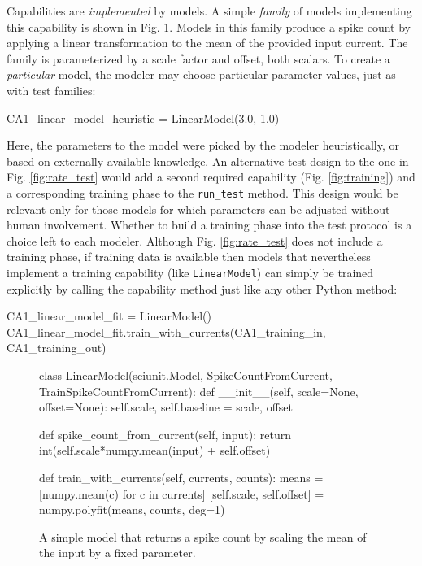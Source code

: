 \documentclass[11pt,letterpaper]{article}
\begin{document}
Capabilities are \emph{implemented} by models. A simple \emph{family} of models implementing this capability is shown in Fig. \ref{fig:simple_model}. Models in this family produce a spike count by applying a linear transformation to the mean of the provided input current. The family is parameterized by a scale factor and offset, both scalars. To create a \emph{particular} model, the modeler may choose particular parameter values, just as with test families:
\begin{python}
CA1_linear_model_heuristic = LinearModel(3.0, 1.0)
\end{python}
Here, the parameters to the model were picked by the modeler heuristically, or based on externally-available knowledge. An alternative test design to the one in Fig. \ref{fig:rate_test} would add a second required capability (Fig. \ref{fig:training}) and a corresponding training phase to the \verb|run_test| method. This design would be relevant only for those models for which parameters can be adjusted without human involvement. Whether to build a training phase into the test protocol is a choice left to each modeler. Although Fig. \ref{fig:rate_test} does not include a training phase, if training data is available then models that nevertheless implement a training capability (like \verb|LinearModel|) can simply be trained explicitly by calling the capability method just like any other Python method:
\begin{python}
CA1_linear_model_fit = LinearModel()
CA1_linear_model_fit.train_with_currents(CA1_training_in, CA1_training_out)
\end{python}
\begin{figure}
\begin{python}
class LinearModel(sciunit.Model, SpikeCountFromCurrent, 
    TrainSpikeCountFromCurrent):
  def __init__(self, scale=None, offset=None): 
    self.scale, self.baseline = scale, offset
    
  def spike_count_from_current(self, input):
    return int(self.scale*numpy.mean(input) + self.offset)

  def train_with_currents(self, currents, counts):
    means = [numpy.mean(c) for c in currents]
    [self.scale, self.offset] = numpy.polyfit(means, counts, deg=1)    
\end{python}
\caption{A simple model that returns a spike count by scaling the mean of the input by a fixed parameter.}
\label{fig:simple_model}
\vspace{-15px}
\end{figure}
\end{document}
